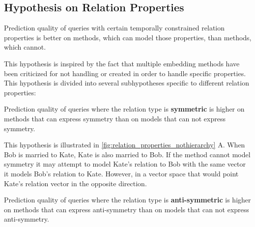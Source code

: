 \subsection{Hypothesis on Relation Properties}
\label{sec:hypothesis_relation_properties}



\begin{hypothesis}
\label{hyp:relation_properties}
Prediction quality of queries with certain temporally constrained relation properties is better on methods, which can model those properties, than methods, which cannot.
\end{hypothesis}

This hypothesis is inspired by the fact that multiple embedding methods have been criticized for not handling or created in order to handle specific properties.
\missing[Examples]
This hypothesis is divided into several subhypotheses specific to different relation properties:

\begin{subhypothesis}
Prediction quality of queries where the relation type is \textbf{symmetric} is higher on methods that can express symmetry than on models that can not express symmetry.
\end{subhypothesis}

This hypothesis is illustrated in \autoref{fig:relation_properties_nothierarchy} A. When Bob is married to Kate, Kate is also married to Bob. If the method cannot model symmetry it may attempt to model Kate's relation to Bob with the same vector it models Bob's relation to Kate. However, in a vector space that would point Kate's relation vector in the opposite direction.

\begin{subhypothesis}
Prediction quality of queries where the relation type is \textbf{anti-symmetric} is higher on methods that can express anti-symmetry than on models that can not express anti-symmetry.
\end{subhypothesis}


